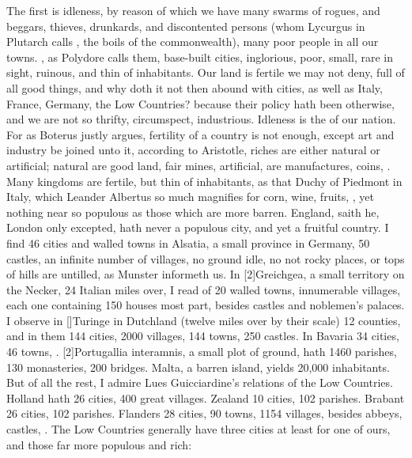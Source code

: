 {The first is idleness, by reason of which we have many swarms of
rogues, and beggars, thieves, drunkards, and discontented persons (whom
Lycurgus in Plutarch calls , the boils of the
commonwealth), many poor people in all our towns. ,
as Polydore calls them, base-built cities, inglorious, poor,
small, rare in sight, ruinous, and thin of inhabitants. Our land is
fertile we may not deny, full of all good things, and why doth it not
then abound with cities, as well as Italy, France, Germany, the Low
Countries? because their policy hath been otherwise, and we are not so
thrifty, circumspect, industrious. Idleness is the  of our
nation. For as Boterus justly argues, fertility of a country is
not enough, except art and industry be joined unto it, according to
Aristotle, riches are either natural or artificial; natural are good
land, fair mines, \etc{} artificial, are manufactures, coins, \etc{}. Many
kingdoms are fertile, but thin of inhabitants, as that Duchy of
Piedmont in Italy, which Leander Albertus so much magnifies for corn,
wine, fruits, \etc{}, yet nothing near so populous as those which are more
barren. England, saith he, London only excepted, hath never a
populous city, and yet a fruitful country. I find 46 cities and walled
towns in Alsatia, a small province in Germany, 50 castles, an infinite
number of villages, no ground idle, no not rocky places, or tops of
hills are untilled, as Munster informeth us. In [2\baselineskip]Greichgea, a
small territory on the Necker, 24 Italian miles over, I read of 20
walled towns, innumerable villages, each one containing 150 houses most
part, besides castles and noblemen's palaces. I observe in [\baselineskip]Turinge
in Dutchland (twelve miles over by their scale) 12 counties, and in
them 144 cities, 2000 villages, 144 towns, 250 castles. In Bavaria
34 cities, 46 towns, \etc{}. [2\baselineskip]Portugallia interamnis, a small plot of
ground, hath 1460 parishes, 130 monasteries, 200 bridges. Malta, a
barren island, yields 20,000 inhabitants. But of all the rest, I admire
Lues Guicciardine's relations of the Low Countries. Holland hath 26
cities, 400 great villages. Zealand 10 cities, 102 parishes. Brabant 26
cities, 102 parishes. Flanders 28 cities, 90 towns, 1154 villages,
besides abbeys, castles, \etc{}. The Low Countries generally have three
cities at least for one of ours, and those far more populous and rich:
}

